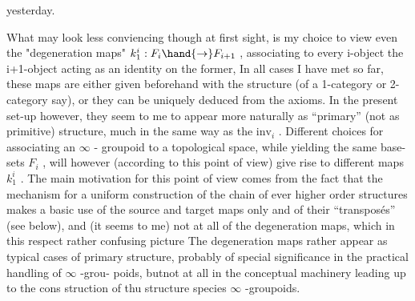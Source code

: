 
yesterday.

What may look less conviencing though at first sight, is my choice
to view  even the "degeneration maps" $k^{i}_{1} : F_{i} \hand{\to} F_{i+1}$ , associating to
every i-object the \hand{(}i+1\hand{)}-object acting as an identity on the former, In
all cases I have met so far, these maps are either given beforehand with
the structure (of a 1-category or 2-category\hand{,} say), or they can be uniquely
deduced from the axioms. In the present set-up however, they seem to me
to appear more naturally as ``primary'' (not as primitive) structure, much
in the same way as the $\mathrm{inv}_{i}$ . Different choices for associating an $\infty$ -
groupoid to a topological space, while yielding the same base-sets $F_{i}$ ,
will however (according to this point of view) give rise to different
maps $k^{i}_{1}$ . The main motivation for this point of view comes from the fact
that the mechanism for a uniform construction of the chain of ever higher
order structures makes a basic use of the source and target maps only and
of their ``transposés'' (see below), and (it seems to me) not at all of the
degeneration maps, which in this respect  rather  confusing   picture 
\margin{(}The degeneration maps rather appear as typical cases of primary structure,
probably of special significance in the practical handling of $\infty$ -grou-%
poids, but\hand{/}not at all in the conceptual machinery leading up to the cons
struction of thu structure species $\infty$ -groupoids.

